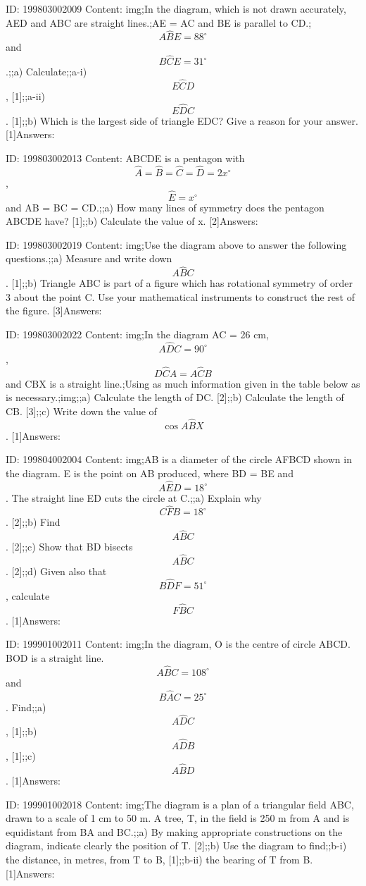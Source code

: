 \documentclass{article}
\begin{document}
ID: 199803002009
Content:
img;In the diagram, which is not drawn accurately, AED and ABC are straight lines.;AE = AC and BE is parallel to CD.;$$A \hat BE = 88^{\circ}$$ and $$B \hat CE = 31^{\circ}$$.;;a) Calculate;;a-i) $$E \hat CD$$, [1];;a-ii) $$E \hat DC$$. [1];;b) Which is the largest side of triangle EDC? Give a reason for your answer. [1]Answers:

ID: 199803002013
Content:
ABCDE is a pentagon with $$\hat A = \hat B = \hat C = \hat D = 2x^{\circ}$$, $$\hat E = x^{\circ}$$ and AB = BC = CD.;;a) How many lines of symmetry does the pentagon ABCDE have? [1];;b) Calculate the value of x. [2]Answers:

ID: 199803002019
Content:
img;Use the diagram above to answer the following questions.;;a) Measure and write down $$A \hat BC$$. [1];;b) Triangle ABC is part of a figure which has rotational symmetry of order 3 about the point C. Use your mathematical instruments to construct the rest of the figure. [3]Answers:

ID: 199803002022
Content:
img;In the diagram AC = 26 cm, $$A \hat DC = 90^{\circ}$$, $$D \hat CA = A \hat CB$$ and CBX is a straight line.;Using as much information given in the table below as is necessary.;img;;a) Calculate the length of DC. [2];;b) Calculate the length of CB. [3];;c) Write down the value of $$\cos A \hat BX$$. [1]Answers:

ID: 199804002004
Content:
img;AB is a diameter of the circle AFBCD shown in the diagram. E is the point on AB produced, where BD = BE and $$A \hat ED = 18^{\circ}$$. The straight line ED cuts the circle at C.;;a) Explain why $$C \hat FB = 18^{\circ}$$. [2];;b) Find $$A \hat BC$$. [2];;c) Show that BD bisects $$A \hat BC$$. [2];;d) Given also that $$B \hat DF = 51^{\circ}$$, calculate $$F \hat BC$$. [1]Answers:

ID: 199901002011
Content:
img;In the diagram, O is the centre of circle ABCD. BOD is a straight line. $$A \hat BC=108^{\circ}$$ and $$B \hat AC=25^{\circ}$$. Find;;a) $$A \hat DC$$, [1];;b) $$A \hat DB$$, [1];;c) $$A \hat BD$$. [1]Answers:

ID: 199901002018
Content:
img;The diagram is a plan of a triangular field ABC, drawn to a scale of 1 cm to 50 m. A tree, T, in the field is 250 m from A and is equidistant from BA and BC.;;a) By making appropriate constructions on the diagram, indicate clearly the position of T. [2];;b) Use the diagram to find;;b-i) the distance, in metres, from T to B, [1];;b-ii) the bearing of T from B. [1]Answers:
\end{document}
